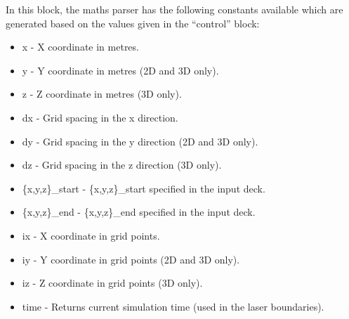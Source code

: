 In this block, the maths parser has the following constants available
which are generated based on the values given in the ``control'' block:
\begin{itemize}
\item x - X coordinate in metres.
\item y - Y coordinate in metres (2D and 3D only).
\item z - Z coordinate in metres (3D only).
\item dx - Grid spacing in the x direction.
\item dy - Grid spacing in the y direction (2D and 3D only).
\item dz - Grid spacing in the z direction (3D only).
\item \{x,y,z\}\_start - \{x,y,z\}\_start specified in the input deck.
\item \{x,y,z\}\_end - \{x,y,z\}\_end specified in the input deck.
\item ix - X coordinate in grid points.
\item iy - Y coordinate in grid points (2D and 3D only).
\item iz - Z coordinate in grid points (3D only).
\item time - Returns current simulation time (used in the laser boundaries).
\end{itemize}

